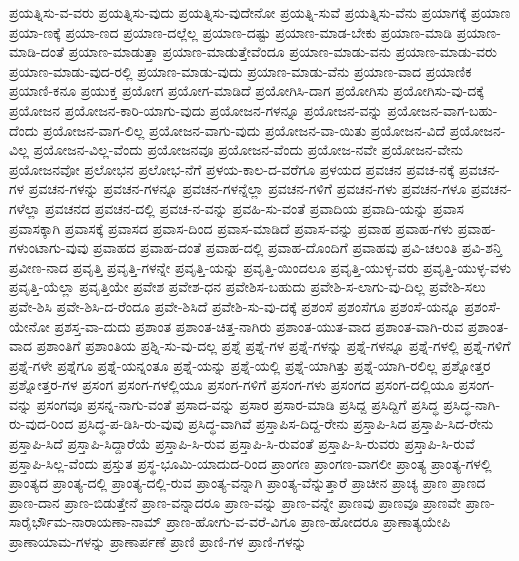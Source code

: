 {ಪ್ರಯತ್ನಿಸು-ವ-ವರು
ಪ್ರಯತ್ನಿಸು-ವುದು
ಪ್ರಯತ್ನಿಸು-ವುದೇನೋ
ಪ್ರಯತ್ನಿ-ಸುವೆ
ಪ್ರಯತ್ನಿಸು-ವೆನು
ಪ್ರಯಾಗಕ್ಕೆ
ಪ್ರಯಾಣ
ಪ್ರಯಾ-ಣಕ್ಕೆ
ಪ್ರಯಾ-ಣದ
ಪ್ರಯಾಣ-ದಲ್ಲೆಲ್ಲ
ಪ್ರಯಾಣ-ದಷ್ಟು
ಪ್ರಯಾಣ-ಮಾಡ-ಬೇಕು
ಪ್ರಯಾಣ-ಮಾಡಿ
ಪ್ರಯಾಣ-ಮಾಡಿ-ದಂತೆ
ಪ್ರಯಾಣ-ಮಾಡುತ್ತಾ
ಪ್ರಯಾಣ-ಮಾಡುತ್ತೇವೆಂದೂ
ಪ್ರಯಾಣ-ಮಾಡು-ವನು
ಪ್ರಯಾಣ-ಮಾಡು-ವರು
ಪ್ರಯಾಣ-ಮಾಡು-ವುದ-ರಲ್ಲಿ
ಪ್ರಯಾಣ-ಮಾಡು-ವುದು
ಪ್ರಯಾಣ-ಮಾಡು-ವೆನು
ಪ್ರಯಾಣ-ವಾದ
ಪ್ರಯಾಣಿಕ
ಪ್ರಯಾಣಿ-ಕನೂ
ಪ್ರಯುಕ್ತ
ಪ್ರಯೋಗ
ಪ್ರಯೋಗ-ಮಾಡಿದೆ
ಪ್ರಯೋಗಿಸಿ-ದಾಗ
ಪ್ರಯೋಗಿಸು
ಪ್ರಯೋಗಿಸು-ವು-ದಕ್ಕೆ
ಪ್ರಯೋಜನ
ಪ್ರಯೋಜನ-ಕಾರಿ-ಯಾಗು-ವುದು
ಪ್ರಯೋಜನ-ಗಳನ್ನೂ
ಪ್ರಯೋಜನ-ವನ್ನು
ಪ್ರಯೋಜನ-ವಾಗ-ಬಹು-ದೆಂದು
ಪ್ರಯೋಜನ-ವಾಗ-ಲಿಲ್ಲ
ಪ್ರಯೋಜನ-ವಾಗು-ವುದು
ಪ್ರಯೋಜನ-ವಾ-ಯಿತು
ಪ್ರಯೋಜನ-ವಿದೆ
ಪ್ರಯೋಜನ-ವಿಲ್ಲ
ಪ್ರಯೋಜನ-ವಿಲ್ಲ-ವೆಂದು
ಪ್ರಯೋಜನವೂ
ಪ್ರಯೋಜನ-ವೆಂದು
ಪ್ರಯೋಜ-ನವೇ
ಪ್ರಯೋಜನ-ವೇನು
ಪ್ರಯೋಜನವೋ
ಪ್ರಲೋಭನ
ಪ್ರಲೋಭ-ನೆಗೆ
ಪ್ರಳಯ-ಕಾಲ-ದ-ವರೆಗೂ
ಪ್ರಳಯದ
ಪ್ರವಚನ
ಪ್ರವಚ-ನಕ್ಕೆ
ಪ್ರವಚನ-ಗಳ
ಪ್ರವಚನ-ಗಳನ್ನು
ಪ್ರವಚನ-ಗಳನ್ನೂ
ಪ್ರವಚನ-ಗಳನ್ನೆಲ್ಲಾ
ಪ್ರವಚನ-ಗಳಿಗೆ
ಪ್ರವಚನ-ಗಳು
ಪ್ರವಚನ-ಗಳೂ
ಪ್ರವಚನ-ಗಳೆಲ್ಲಾ
ಪ್ರವಚನದ
ಪ್ರವಚನ-ದಲ್ಲಿ
ಪ್ರವಚ-ನ-ವನ್ನು
ಪ್ರವಹಿ-ಸು-ವಂತೆ
ಪ್ರವಾದಿಯ
ಪ್ರವಾದಿ-ಯನ್ನು
ಪ್ರವಾಸ
ಪ್ರವಾಸಕ್ಕಾಗಿ
ಪ್ರವಾಸಕ್ಕೆ
ಪ್ರವಾಸದ
ಪ್ರವಾಸ-ದಿಂದ
ಪ್ರವಾಸ-ಮಾಡಿದೆ
ಪ್ರವಾಸ-ವನ್ನು
ಪ್ರವಾಹ
ಪ್ರವಾಹ-ಗಳು
ಪ್ರವಾಹ-ಗಳುಂಟಾಗು-ವುವು
ಪ್ರವಾಹದ
ಪ್ರವಾಹ-ದಂತೆ
ಪ್ರವಾಹ-ದಲ್ಲಿ
ಪ್ರವಾಹ-ದೊಂದಿಗೆ
ಪ್ರವಾಹವು
ಪ್ರವಿ-ಚಲಂತಿ
ಪ್ರವಿ-ಶನ್ತಿ
ಪ್ರವೀಣ-ನಾದ
ಪ್ರವೃತ್ತಿ
ಪ್ರವೃತ್ತಿ-ಗಳನ್ನೇ
ಪ್ರವೃತ್ತಿ-ಯನ್ನು
ಪ್ರವೃತ್ತಿ-ಯಿಂದಲೂ
ಪ್ರವೃತ್ತಿ-ಯುಳ್ಳ-ವರು
ಪ್ರವೃತ್ತಿ-ಯುಳ್ಳ-ವಳು
ಪ್ರವೃತ್ತಿ-ಯೆಲ್ಲಾ
ಪ್ರವೃತ್ತಿಯೇ
ಪ್ರವೇಶ
ಪ್ರವೇಶ-ಧನ
ಪ್ರವೇಶಿಸ-ಬಹುದು
ಪ್ರವೇಶಿ-ಸ-ಲಾಗು-ವು-ದಿಲ್ಲ
ಪ್ರವೇಶಿ-ಸಲು
ಪ್ರವೇ-ಶಿಸಿ
ಪ್ರವೇ-ಶಿಸಿ-ದ-ರೆಂದೂ
ಪ್ರವೇ-ಶಿಸಿದೆ
ಪ್ರವೇಶಿ-ಸು-ವು-ದಕ್ಕೆ
ಪ್ರಶಂಸೆ
ಪ್ರಶಂಸೆಗೂ
ಪ್ರಶಂಸೆ-ಯನ್ನೂ
ಪ್ರಶಂಸೆ-ಯೇನೋ
ಪ್ರಶಸ್ತ-ವಾ-ದುದು
ಪ್ರಶಾಂತ
ಪ್ರಶಾಂತ-ಚಿತ್ತ-ನಾಗಿರು
ಪ್ರಶಾಂತ-ಯುತ-ವಾದ
ಪ್ರಶಾಂತ-ವಾಗಿ-ರುವ
ಪ್ರಶಾಂತ-ವಾದ
ಪ್ರಶಾಂತಿಗೆ
ಪ್ರಶಾಂತಿಯ
ಪ್ರಶ್ನಿ-ಸು-ವು-ದಲ್ಲ
ಪ್ರಶ್ನೆ
ಪ್ರಶ್ನೆ-ಗಳ
ಪ್ರಶ್ನೆ-ಗಳನ್ನು
ಪ್ರಶ್ನೆ-ಗಳನ್ನೂ
ಪ್ರಶ್ನೆ-ಗಳಲ್ಲಿ
ಪ್ರಶ್ನೆ-ಗಳಿಗೆ
ಪ್ರಶ್ನೆ-ಗಳೇ
ಪ್ರಶ್ನೆಗೂ
ಪ್ರಶ್ನೆ-ಯನ್ನಂತೂ
ಪ್ರಶ್ನೆ-ಯನ್ನು
ಪ್ರಶ್ನೆ-ಯಲ್ಲಿ
ಪ್ರಶ್ನೆ-ಯಾಗಿತ್ತು
ಪ್ರಶ್ನೆ-ಯಾಗಿ-ರಲಿಲ್ಲ
ಪ್ರಶ್ನೋತ್ತರ
ಪ್ರಶ್ನೋತ್ತರ-ಗಳ
ಪ್ರಸಂಗ
ಪ್ರಸಂಗ-ಗಳಲ್ಲಿಯೂ
ಪ್ರಸಂಗ-ಗಳಿಗೆ
ಪ್ರಸಂಗ-ಗಳು
ಪ್ರಸಂಗದ
ಪ್ರಸಂಗ-ದಲ್ಲಿಯೂ
ಪ್ರಸಂಗ-ವನ್ನು
ಪ್ರಸಂಗವೂ
ಪ್ರಸನ್ನ-ನಾಗು-ವಂತೆ
ಪ್ರಸಾದ-ವನ್ನು
ಪ್ರಸಾರ
ಪ್ರಸಾರ-ಮಾಡಿ
ಪ್ರಸಿದ್ದ
ಪ್ರಸಿದ್ದಿಗೆ
ಪ್ರಸಿದ್ಧ
ಪ್ರಸಿದ್ಧ-ನಾಗಿ-ರು-ವುದ-ರಿಂದ
ಪ್ರಸಿದ್ಧ-ಪ-ಡಿಸಿ-ರು-ವುವು
ಪ್ರಸಿದ್ಧ-ವಾಗಿವೆ
ಪ್ರಸ್ತಾಪಿಸ-ದಿದ್ದ-ರೇನು
ಪ್ರಸ್ತಾಪಿ-ಸಿದ
ಪ್ರಸ್ತಾಪಿ-ಸಿದ-ರೇನು
ಪ್ರಸ್ತಾಪಿ-ಸಿದೆ
ಪ್ರಸ್ತಾಪಿ-ಸಿದ್ದಾರೆಯೆ
ಪ್ರಸ್ತಾಪಿ-ಸಿ-ರುವ
ಪ್ರಸ್ತಾಪಿ-ಸಿ-ರುವಂತೆ
ಪ್ರಸ್ತಾಪಿ-ಸಿ-ರುವರು
ಪ್ರಸ್ತಾಪಿ-ಸಿ-ರುವೆ
ಪ್ರಸ್ತಾಪಿ-ಸಿಲ್ಲ-ವೆಂದು
ಪ್ರಸ್ತುತ
ಪ್ರಸ್ಥ-ಭೂಮಿ-ಯಾದುದ-ರಿಂದ
ಪ್ರಾಂಗಣ
ಪ್ರಾಂಗಣ-ವಾಗಲೀ
ಪ್ರಾಂತ್ಯ
ಪ್ರಾಂತ್ಯ-ಗಳಲ್ಲಿ
ಪ್ರಾಂತ್ಯದ
ಪ್ರಾಂತ್ಯ-ದಲ್ಲಿ
ಪ್ರಾಂತ್ಯ-ದಲ್ಲಿ-ರುವ
ಪ್ರಾಂತ್ಯ-ವನ್ನಾಗಿ
ಪ್ರಾಂತ್ಯ-ವೆನ್ನುತ್ತಾರೆ
ಪ್ರಾಚೀನ
ಪ್ರಾಚ್ಯ
ಪ್ರಾಣ
ಪ್ರಾಣದ
ಪ್ರಾಣ-ದಾನ
ಪ್ರಾಣ-ಬಿಡುತ್ತೇನೆ
ಪ್ರಾಣ-ವನ್ನಾದರೂ
ಪ್ರಾಣ-ವನ್ನು
ಪ್ರಾಣ-ವನ್ನೇ
ಪ್ರಾಣವು
ಪ್ರಾಣವೂ
ಪ್ರಾಣವೇ
ಪ್ರಾಣ-ಸಾರೈರ್ಭೌಮ-ನಾರಾಯಣಾ-ನಾಮ್
ಪ್ರಾಣ-ಹೋಗು-ವ-ವರೆ-ವಿಗೂ
ಪ್ರಾಣ-ಹೋದರೂ
ಪ್ರಾಣಾತ್ಯಯೇಪಿ
ಪ್ರಾಣಾಯಾಮ-ಗಳನ್ನು
ಪ್ರಾಣಾರ್ಪಣೆ
ಪ್ರಾಣಿ
ಪ್ರಾಣಿ-ಗಳ
ಪ್ರಾಣಿ-ಗಳನ್ನು
}
